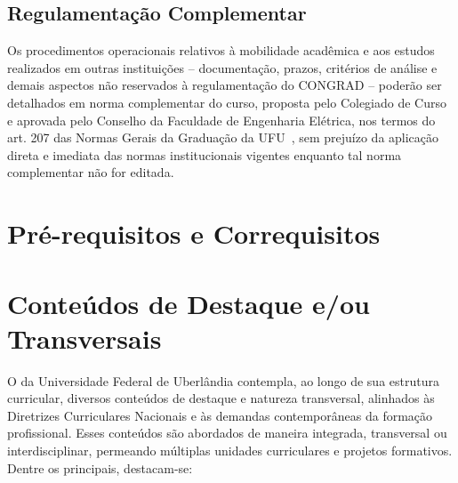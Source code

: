 \subsection{Regulamentação Complementar}
\label{sec:norma_complementar_mobilidade}

Os procedimentos operacionais relativos à mobilidade acadêmica e aos estudos realizados em outras instituições -- documentação, prazos, critérios de análise e demais aspectos não reservados à regulamentação do CONGRAD -- poderão ser detalhados em norma complementar do curso, proposta pelo Colegiado de Curso e aprovada pelo Conselho da Faculdade de Engenharia Elétrica, nos termos do art. 207 das Normas Gerais da Graduação da UFU~\cite{ufu_congrad_46_2022}, sem prejuízo da aplicação direta e imediata das normas institucionais vigentes enquanto tal norma complementar não for editada.

\section{Pré-requisitos e Correquisitos}


\section{Conteúdos de Destaque e/ou Transversais}

O \ppccurso da Universidade Federal de Uberlândia contempla, ao longo de sua estrutura curricular, diversos conteúdos de destaque e natureza transversal, alinhados às Diretrizes Curriculares Nacionais e às demandas contemporâneas da formação profissional. Esses conteúdos são abordados de maneira integrada, transversal ou interdisciplinar, permeando múltiplas unidades curriculares e projetos formativos. Dentre os principais, destacam-se:

